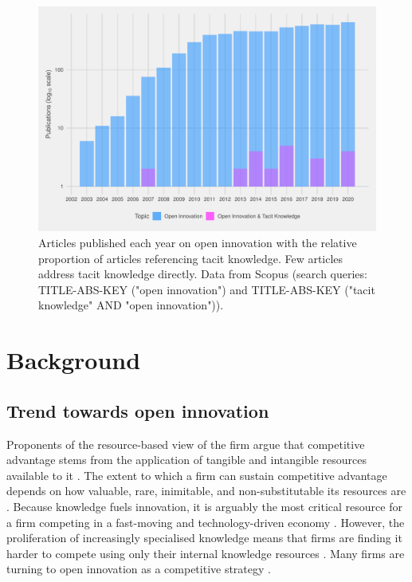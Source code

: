 \begin{figure}[hbt!]
\centering
\includegraphics[width=0.9\linewidth]{Images/tk_oi.pdf}
\caption[Articles published each year on open innovation]{Articles published each year on open innovation with the relative proportion of articles referencing tacit knowledge. Few articles address tacit knowledge directly. Data from Scopus (search queries: TITLE-ABS-KEY ("open innovation") and TITLE-ABS-KEY ("tacit knowledge"  AND  "open innovation")).}
\label{fig:biblio}
\end{figure}

\section{Background}

\subsection{Trend towards open innovation} \label{sss:oi}

Proponents of the resource-based view of the firm argue that competitive advantage stems from the application of tangible and intangible resources available to it \citep{wernerfelt1984resource,peteraf1993cornerstones}. The extent to which a firm can sustain competitive advantage depends on how valuable, rare, inimitable, and non-substitutable its resources are \citep{barney1991firm}. Because knowledge fuels innovation, it is arguably the most critical resource for a firm competing in a fast-moving and technology-driven economy \citep{grant1996toward,urbancova2013competitive}. However, the proliferation of increasingly specialised knowledge means that firms are finding it harder to compete using only their internal knowledge resources \citep{chesbrough2009open,enkel2009open}. Many firms are turning to open innovation as a competitive strategy \citep{stanko2017under,lee2019does}. \medskip

